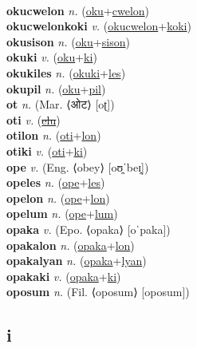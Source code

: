  \label{okumihutatuniluhilasomales} \\
\textbf{okucwelon} \textit{n.} (\hyperref[oku]{oku}+\hyperref[cwelon]{cwelon})
 \label{okucwelon} \\
\textbf{okucwelonkoki} \textit{v.} (\hyperref[okucwelon]{okucwelon}+\hyperref[koki]{koki})
 \label{okucwelonkoki} \\
\textbf{okusison} \textit{n.} (\hyperref[oku]{oku}+\hyperref[sison]{sison})
 \label{okusison} \\
\textbf{okuki} \textit{v.} (\hyperref[oku]{oku}+\hyperref[ki]{ki})
 \label{okuki} \\
\textbf{okukiles} \textit{n.} (\hyperref[okuki]{okuki}+\hyperref[les]{les})
 \label{okukiles} \\
\textbf{okupil} \textit{n.} (\hyperref[oku]{oku}+\hyperref[pil]{pil})
 \label{okupil} \\
\textbf{ot} \textit{n.} (Mar. ⟨ओट⟩ [oʈ])
 \label{ot} \\
\textbf{oti} \textit{v.} (\hyperref[elu]{\sout{elu}})
 \label{oti} \\
\textbf{otilon} \textit{n.} (\hyperref[oti]{oti}+\hyperref[lon]{lon})
 \label{otilon} \\
\textbf{otiki} \textit{v.} (\hyperref[oti]{oti}+\hyperref[ki]{ki})
 \label{otiki} \\
\textbf{ope} \textit{v.} (Eng. ⟨obey⟩ [oʊ̯ˈbeɪ̯])
 \label{ope} \\
\textbf{opeles} \textit{n.} (\hyperref[ope]{ope}+\hyperref[les]{les})
 \label{opeles} \\
\textbf{opelon} \textit{n.} (\hyperref[ope]{ope}+\hyperref[lon]{lon})
 \label{opelon} \\
\textbf{opelum} \textit{n.} (\hyperref[ope]{ope}+\hyperref[lum]{lum})
 \label{opelum} \\
\textbf{opaka} \textit{v.} (Epo. ⟨opaka⟩ [oˈpaka])
 \label{opaka} \\
\textbf{opakalon} \textit{n.} (\hyperref[opaka]{opaka}+\hyperref[lon]{lon})
 \label{opakalon} \\
\textbf{opakalyan} \textit{n.} (\hyperref[opaka]{opaka}+\hyperref[lyan]{lyan})
 \label{opakalyan} \\
\textbf{opakaki} \textit{v.} (\hyperref[opaka]{opaka}+\hyperref[ki]{ki})
 \label{opakaki} \\
\textbf{oposum} \textit{n.} (Fil. ⟨oposum⟩ [oposum])
 \label{oposum} \\
\subsection{i}

